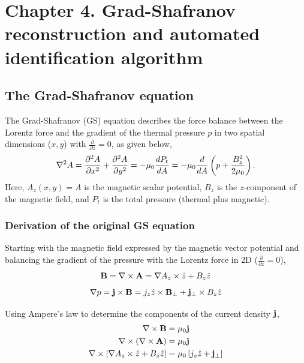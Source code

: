 \chapter{Chapter 4. Grad-Shafranov reconstruction and automated identification algorithm} \label{ch:ch4_GS} %

\section{The Grad-Shafranov equation}
%
The Grad-Shafranov (GS) equation describes the force balance between the Lorentz force and the gradient of the thermal pressure $p$ \citep{Sonnerup:1996, Hau:1999} in two spatial dimensions ($x,y$) with $\frac{\partial}{\partial z}=0$, as given below,
\begin{equation}
    \nabla^2 A = \frac{\partial^{2} A}{\partial x^{2}} + \frac{\partial^{2} A}{\partial y^{2}} = -\mu_0 \frac{d P_t}{d A} = - \mu_0\frac{d }{d A}\left( p + \frac{B_z^2}{2\mu_0} \right).
    \label{eq:GS}
\end{equation}
Here, $A_z(x,y) = A$ is the magnetic scalar potential, $B_z$ is the $z$-component of the magnetic field, and $P_t$ is the total pressure (thermal plus magnetic).

\subsection{Derivation of the original GS equation}
Starting with the magnetic field expressed by the magnetic vector potential and balancing the gradient of the pressure with the Lorentz force in 2D ($\frac{\partial}{\partial z}=0$),
\begin{equation}
    \mathbf{B} = \nabla \times\mathbf{A} = \nabla A_z\times\hat{z} + B_z\hat{z}
    \label{eq:B}
\end{equation}
\begin{equation}
    \nabla p = \mathbf{j}\times\mathbf{B} = j_z\hat{z}\times\mathbf{B}_\perp + \mathbf{j}_\perp\times B_z\hat{z}
    \label{eq:gradp}
\end{equation}

\noindent Using Ampere's law to determine the components of the current density $\mathbf{j}$,
\begin{equation}
    \begin{split}
        \nabla \times\mathbf{B} &= \mu_0\mathbf{j} \\
        \nabla \times\left( \nabla \times\mathbf{A} \right) & = \mu_0\mathbf{j} \\
        \nabla \times\left[ \nabla A_z\times\hat{z} + B_z\hat{z} \right] &= \mu_0\left[ j_z\hat{z} + \mathbf{j}_\perp \right] \\
    \end{split}
    \label{eq:Amperes}
\end{equation}


